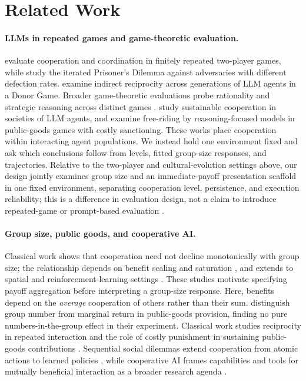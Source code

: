 \documentclass[11pt]{article}
\begin{document}


\section{Related Work}
\label{sec:related}
\paragraph{LLMs in repeated games and game-theoretic evaluation.}
\citet{akata2025repeated} evaluate cooperation and coordination in finitely repeated two-player games, while \citet{fontana2025nicer} study the iterated Prisoner's Dilemma against adversaries with different defection rates. \citet{vallinder2025cultural} examine indirect reciprocity across generations of LLM agents in a Donor Game. Broader game-theoretic evaluations probe rationality and strategic reasoning across distinct games \citep{fan2024rational,duan2024gtbench}.
\citet{piatti2024cooperate} study sustainable cooperation in societies of LLM agents, and \citet{piedrahita2025corrupted} examine free-riding by reasoning-focused models in public-goods games with costly sanctioning. These works place cooperation within interacting agent populations. We instead hold one environment fixed and ask which conclusions follow from levels, fitted group-size responses, and trajectories.
Relative to the two-player and cultural-evolution settings above, our design jointly examines group size and an immediate-payoff presentation scaffold in one fixed environment, separating cooperation level, persistence, and execution reliability; this is a difference in evaluation design, not a claim to introduce repeated-game or prompt-based evaluation \citep{akata2025repeated,fontana2025nicer,vallinder2025cultural}.

\paragraph{Group size, public goods, and cooperative AI.}
Classical work shows that cooperation need not decline monotonically with group size; the relationship depends on benefit scaling and saturation \citep{scirep2015groupsize,plos2015curvilinear}, and extends to spatial and reinforcement-learning settings \citep{szolnoki2012spatial,rsos2024rlpgg}. These studies motivate specifying payoff aggregation before interpreting a group-size response. Here, benefits depend on the \emph{average} cooperation of others rather than their sum.
\citet{isaac1988groupsize} distinguish group number from marginal return in public-goods provision, finding no pure numbers-in-the-group effect in their experiment. Classical work studies reciprocity in repeated interaction \citep{axelrod1981cooperation} and the role of costly punishment in sustaining public-goods contributions \citep{fehr2000punishment}. Sequential social dilemmas extend cooperation from atomic actions to learned policies \citep{leibo2017sequential}, while cooperative AI frames capabilities and tools for mutually beneficial interaction as a broader research agenda \citep{dafoe2020cooperative}.
\end{document}
